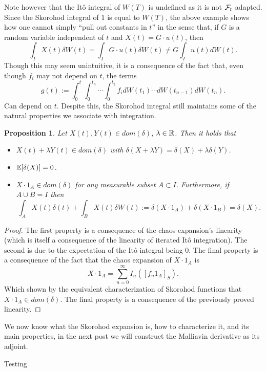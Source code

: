 \documentclass[12pt]{article}
\newtheorem{proposition}{Proposition}
\begin{document}
Note however that the Itô integral of $W(T)$ is undefined as it is not  $\mathcal{F}_t$ adapted. Since the Skorohod integral of $1$ is equal to  $W(T)$, the above example shows how one cannot simply ``pull out constants in $t$'' in the sense that, if $G$ is a random variable independent of  $t$ and  $X(t)=G\cdot u(t)$, then
\begin{equation*}
	\int_{I} X(t) \delta W(t)=\int_{I}G\cdot u(t)\delta W(t) \neq G\int_{I}u(t) dW(t).
\end{equation*}
Though this may seem unintuitive, it is a consequence of the fact that, even though $f_i$ may not depend on  $t$, the terms
\begin{equation*}
	g(t):=\int_{0}^t\int_{0}^{t_{n}}\cdots \int_{0}^{t_2} f_i dW(t_1)\cdots dW(t_{n-1})dW(t_n).
\end{equation*}
Can depend on $t$. Despite this, the Skorohod integral still maintains some of the natural properties we associate with integration.
\begin{proposition}
	Let $X(t), Y(t)\in dom(\delta)$, $\lambda \in {\mathbb R}$. Then it holds that
	\begin{itemize}
		\item $X(t)+ \lambda Y(t) \in dom(\delta)$ with $\delta(X+\lambda Y)=\delta(X)+\lambda \delta(Y)$.
		\item $\mathbb{E}[\delta(X)]=0$.
		\item $X\cdot 1_A \in dom(\delta)$ for any measurable subset $A \subset I$. Furthermore, if $A \cup B =I$ then
		      \begin{equation*}
			      \int_{A}X(t) \delta(t)+ \int_{B}X(t)\delta W(t):=\delta(X\cdot 1_A)+\delta(X\cdot 1_B)=\delta(X).
		      \end{equation*}

	\end{itemize}
\end{proposition}

\begin{proof}
	The first property is a consequence of the chaos expansion's linearity (which is itself  a consequence of the linearity of iterated Itô integration). The second is due to the expectation of the Itô integral being $0$. The final property is a consequence of the fact that the chaos expansion of $X\cdot 1_A$ is
	\begin{equation*}
		X\cdot 1_A=\sum_{n=0}^{\infty} I_{n}([f_n 1_A]_S).
	\end{equation*}
	Which shown by the equivalent characterization of Skorohod functions that $X\cdot 1_A\in dom(\delta)$. The final property is a consequence of the previously proved linearity.
\end{proof}
We now know what the Skorohod expansion is, how to characterize it, and its main properties, in the next post we will construct the Malliavin derivative as its adjoint.





Testing
\end{document}
